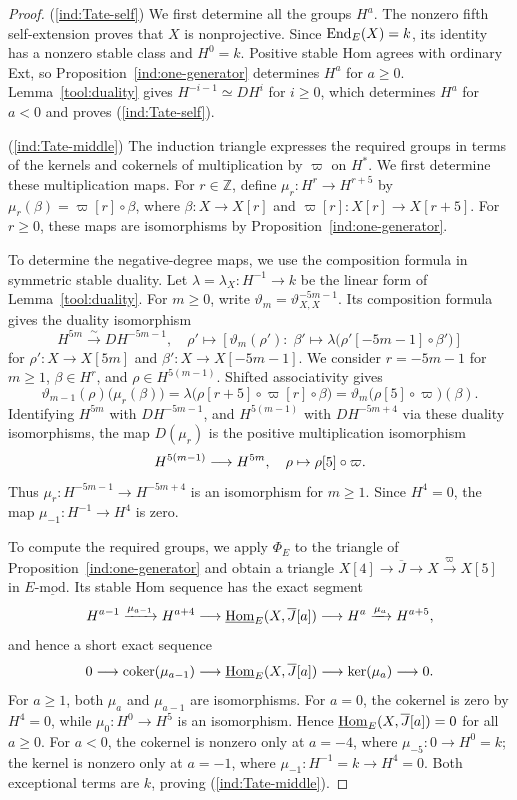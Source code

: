 \documentclass[11pt]{article}
\begin{document}
\begin{proof}
\textup{(\ref{ind:Tate-self})} We first determine all the groups $H^a$. The nonzero
fifth self-extension proves that $X$ is nonprojective.
Since ${\rm End}_E(X)=k$, its identity has a nonzero stable class and
$H^0=k$. Positive stable Hom agrees with ordinary Ext, so
Proposition~\ref{ind:one-generator} determines $H^a$ for $a\ge0$.
Lemma~\ref{tool:duality} gives $H^{-i-1}\simeq DH^i$ for $i\ge0$,
which determines $H^a$ for $a<0$ and proves \textup{(\ref{ind:Tate-self})}.

\textup{(\ref{ind:Tate-middle})} The induction triangle expresses the required groups in
terms of the kernels and cokernels of multiplication by $\varpi$ on
$H^*$. We first determine these multiplication maps.
For $r\in\mathbb Z$, define $\mu_r:H^r\to H^{r+5}$ by
$\mu_r(\beta)=\varpi[r]\circ\beta$, where $\beta:X\to X[r]$ and
$\varpi[r]:X[r]\to X[r+5]$.
For $r\ge0$, these maps are isomorphisms by
Proposition~\ref{ind:one-generator}.

To determine the negative-degree maps, we use the composition formula
in symmetric stable duality. Let $\lambda=\lambda_X:H^{-1}\to k$
be the linear form of Lemma~\ref{tool:duality}. For $m\ge0$, write
$\vartheta_m=\vartheta^{-5m-1}_{X,X}$. Its composition formula
gives the duality isomorphism
$$
H^{5m}\xrightarrow{\sim}D H^{-5m-1},\quad \rho'\mapsto [\vartheta_m(\rho'): \;\beta'\mapsto \lambda\bigl(\rho'[-5m-1]\circ\beta'\bigr)]
$$
for $\rho': X\to X[5m]$ and $\beta': X\to X[-5m-1]$. We consider $r=-5m-1$ for $m\ge 1$, $\beta\in H^r$, and $\rho\in H^{5(m-1)}$. Shifted associativity gives
\[
 \vartheta_{m-1}(\rho)\bigl(\mu_r(\beta)\bigr)
 =\lambda\bigl(\rho[r+5]\circ\varpi[r]\circ\beta\bigr)
 =\vartheta_m\bigl(\rho[5]\circ\varpi\bigr)(\beta).
\]
Identifying $H^{5m}$ with $D H^{-5m-1}$, and $H^{5(m-1)}$ with $D H^{-5m+4}$ via these duality isomorphisms, the map $D(\mu_r)$ is the positive multiplication isomorphism
$$H^{5(m-1)}\longrightarrow H^{5m},\quad \rho\mapsto\rho[5]\circ\varpi.$$
Thus $\mu_r: H^{-5m-1}\to H^{-5m+4}$ is an isomorphism for $m\ge1$. Since $H^4=0$, the map $\mu_{-1}:H^{-1}\to H^4$ is zero.

To compute the required groups, we apply $\Phi_E$ to the triangle of
Proposition~\ref{ind:one-generator} and obtain a triangle
$X[4]\to \overline{J}\to X \xrightarrow{\varpi}X[5]$ in $E\text{-}\underline{\mathrm{mod}}$.
Its stable Hom sequence has the exact segment
\[
 H^{a-1}\xrightarrow{\mu_{a-1}}H^{a+4}
 \longrightarrow\underline{{\rm Hom}}_E(X,\overline J[a])
 \longrightarrow H^a\xrightarrow{\mu_a}H^{a+5},
\]
and hence a short exact sequence
\[
 0\longrightarrow\operatorname{coker}(\mu_{a-1})
 \longrightarrow\underline{{\rm Hom}}_E(X,\overline J[a])
 \longrightarrow\ker(\mu_a)\longrightarrow0.
\]
For $a\ge1$, both $\mu_a$ and $\mu_{a-1}$ are isomorphisms. For $a=0$,
the cokernel is zero by $H^4=0$, while $\mu_0:H^0\to H^5$
is an isomorphism. Hence
$\underline{{\rm Hom}}_E(X,\overline J[a])=0$ for all $a\ge0$.
For $a<0$, the cokernel is nonzero only at $a=-4$, where
$\mu_{-5}:0\to H^0=k$; the kernel is nonzero only at $a=-1$,
where $\mu_{-1}:H^{-1}=k\to H^4=0$.
Both exceptional terms are $k$, proving \textup{(\ref{ind:Tate-middle})}.
\end{proof}
\end{document}
